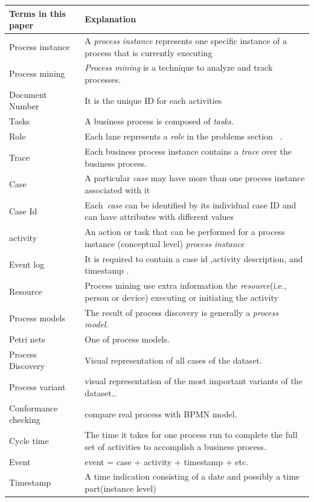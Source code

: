\begin{table}[htb]
\footnotesize	 %
\begin{tabularx}{\textwidth}{X X}

\hline
Terms in this paper   & Explanation \\
\hline
Process instance~\cite{van2011process} & A \textit{process instance} represents one specific instance of a process that is currently executing \\
\hline
Process mining~\cite{Aalst2013} & \textit{Process mining} is a technique to analyze and track processes.\\
\hline
Document Number~\cite{dumasFundamentalsBusinessProcess2018} & It is the unique ID for each activities  \\
\hline
Tasks~\cite{Aalst2013} & A business process is composed of \textit{tasks}. \\
\hline
Role & Each lane represents a \textit{role} in the problems section~\pageref{figure:soAndfieldservice}  . \\
\hline
Trace & Each business process instance contains a \textit{trace} over the business process. \\
\hline
Case &  A particular \textit{case} may have more than one process instance associated with it \\ 
\hline
Case Id & Each~\textit{case} can be identified by its individual case ID and can have attributes with different values\\
\hline
activity & An action or task that can be performed for a process instance (conceptual level) \textit{process instance}\\
\hline
Event log & It is required to contain a case id ,activity description, and timestamp . \\
\hline
Resource~\cite{Aalst2013} & Process mining use extra information the \textit{resource}(i.e., person or device) executing or initiating the activity \\
\hline
Process models~\cite{dumasFundamentalsBusinessProcess2018} & The result of process discovery is generally a \textit{process model}. \\
\hline
Petri nets~\cite{Aalst2013} & One of process models. \\
\hline
Process Discovery~\cite{Aalst2013} & Visual representation of all cases of the dataset. \\
\hline
Process variant~\cite{Aalst2013} & visual representation of the most important variants of the dataset.. \\
\hline
Conformance checking~\cite{Aalst2013} & compare real process with BPMN model. \\
\hline
Cycle time~\cite{Aalst2013} & The time it takes for one process run to complete the full set of activities to accomplish a business process. \\
\hline
Event~\cite{Aalst2013} & event = case + activity + timestamp + etc. \\
\hline
Timestamp~\cite{Aalst2013} & A time indication consisting of a date and possibly a time part(instance level) \\
\hline



\end{tabularx}
\end{table}
